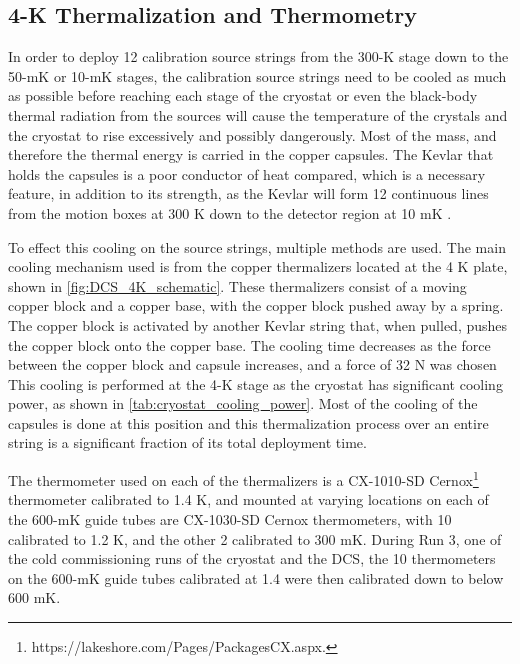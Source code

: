 \subsection*{4-K Thermalization and Thermometry}
\label{ssec:Thermalization_and_Thermometry}
In order to deploy 12 calibration source strings from the 300-K stage down to the 50-mK or 10-mK stages, the calibration source strings need to be cooled as much as possible before reaching each stage of the cryostat or even the black-body thermal radiation from the sources will cause the temperature of the crystals and the cryostat to rise excessively and possibly dangerously. Most of the mass, and therefore the thermal energy is carried in the copper capsules. The Kevlar that holds the capsules is a poor conductor of heat compared, which is a necessary feature, in addition to its strength, as the Kevlar will form 12 continuous lines from the motion boxes at 300 K down to the detector region at 10 mK \cite{VENTURA2009735}.

To effect this cooling on the source strings, multiple methods are used. The main cooling mechanism used is from the copper thermalizers located at the 4 K plate, shown in \autoref{fig:DCS_4K_schematic}. These thermalizers consist of a moving copper block and a copper base, with the copper block pushed away by a spring. The copper block is activated by another Kevlar string that, when pulled, pushes the copper block onto the copper base. The cooling time decreases as the force between the copper block and capsule increases, and a force of 32 N was chosen This cooling is performed at the 4-K stage as the cryostat has significant cooling power, as shown in \autoref{tab:cryostat_cooling_power}. Most of the cooling of the capsules is done at this position and this thermalization process over an entire string is a significant fraction of its total deployment time.

The thermometer used on each of the thermalizers is a CX-1010-SD Cernox\footnote{https://lakeshore.com/Pages/PackagesCX.aspx.} thermometer calibrated to 1.4 K, and mounted at varying locations on each of the 600-mK guide tubes are CX-1030-SD Cernox thermometers, with 10 calibrated to 1.2 K, and the other 2 calibrated to 300 mK.
During Run 3, one of the cold commissioning runs of the cryostat and the DCS, the 10 thermometers on the 600-mK guide tubes calibrated at 1.4 were then calibrated down to below 600 mK.


